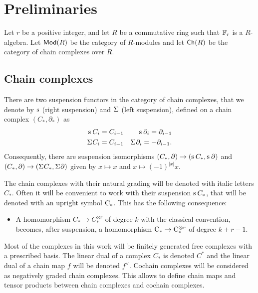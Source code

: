 
\section{Preliminaries} \label{s:preliminaries}



Let $r$ be a positive integer, and let $R$ be a commutative ring such that $\mathbb{F}_r$ is a $R$-algebra. Let $\mathsf{Mod}(R)$ be the category of $R$-modules and let $\mathsf{Ch}(R)$ be the category of chain complexes over $R$. 

\subsection{Chain complexes} There are two suspension functors in the category of chain complexes, that we denote by $\operatorname{s}^{}$ (right suspension) and $\Sigma^{}$ (left suspension), defined on a chain complex $(C_*,\partial_*)$ as
\begin{align*}
    \operatorname{s}^{} C_i &= C_{i-1} & \operatorname{s}^{} \partial_i = \partial_{i-1} \\
    \Sigma^{} C_i &= C_{i-1} & \Sigma^{} \partial_i = -\partial_{i-1}. \\
\end{align*}
Consequently, there are suspension isomorphisms $(C_*,\partial)\to (\operatorname{s}^{} C_*,\operatorname{s}^{}\partial)$ and $(C_*,\partial)\to (\Sigma^{} C_*,\Sigma^{}\partial)$ given by $x\mapsto x$ and $x\mapsto (-1)^{|x|} x$. 

\begin{convention}
    The chain complexes with their natural grading will be denoted with italic letters $C_*$. Often it will be convenient to work with their suspension $\operatorname{s}^{}C_*$, that will be denoted with an upright symbol $\mathrm{C}_*$. This has the following consequence:
\begin{itemize}
    \item A homomorphism $C_*\to C_*^{\otimes r}$ of degree $k$ with the classical convention, becomes, after suspension, a homomorphism $\mathrm{C}_*\to \mathrm{C}_*^{\otimes r}$ of degree $k+r-1$.
\end{itemize}
\end{convention}


Most of the complexes in this work will be finitely generated free complexes with a prescribed basis. 
The linear dual of a complex $C_*$ is denoted $C^*$ and the linear dual of a chain map $f$ will be denoted $f^\vee$. Cochain complexes will be considered as negatively graded chain complexes. This allows to define chain maps and tensor products between chain complexes and cochain complexes.


